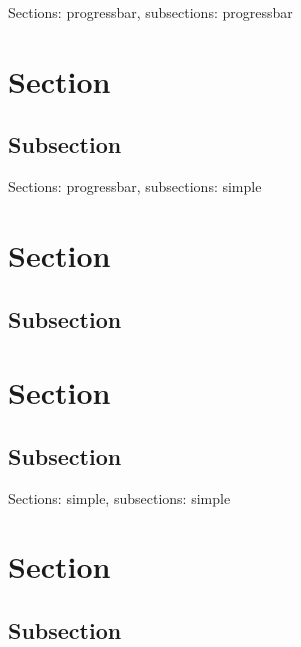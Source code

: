 




\maketitle

\START
\showoutput

\begin{frame}[c]
  Sections: progressbar, subsections: progressbar
\end{frame}

\section[Short section]{Section}
\subsection[Short subsection]{Subsection}

\begin{frame}[c]
  Sections: progressbar, subsections: simple
\end{frame}


\section[Short section]{Section}


\subsection[Short subsection]{Subsection}


\section[Short section]{Section}
\subsection[Short subsection]{Subsection}

\begin{frame}[c]
  Sections: simple, subsections: simple
\end{frame}


\section[Short section]{Section}
\subsection[Short subsection]{Subsection}


